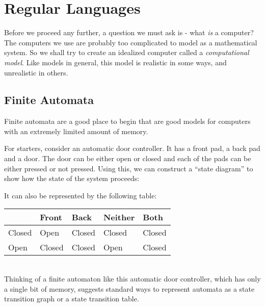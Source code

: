 \section{Regular Languages}

Before we proceed any further, a question we must ask is - what \textit{is} a computer? The computers we use are probably too complicated to model as a mathematical system. So we shall try to create an idealized computer called a \textit{computational model}. Like models in general, this model is realistic in some ways, and unrealistic in others.

\subsection{Finite Automata}

Finite automata are a good place to begin that are good models for computers with an extremely limited amount of memory.

\begin{example}
For starters, consider an automatic door controller. It has a front pad, a back pad and a door. The door can be either open or closed and each of the pads can be either pressed or not pressed. Using this, we can construct a ``state diagram'' to show how the state of the system proceeds:
\begin{center}
\end{center}

It can also be represented by the following table:
\begin{center}
\begin{tabular}{l|llll}
       & Front  & Back   & Neither & Both   \\ \hline
Closed & Open   & Closed & Closed  & Closed \\
Open   & Closed & Closed & Open    & Closed  
\end{tabular}
\end{center}
\end{example}
~\\
Thinking of a finite automaton like this automatic door controller, which has only a single bit of memory, suggests standard ways to represent automata as a state transition graph or a  state transition table.

